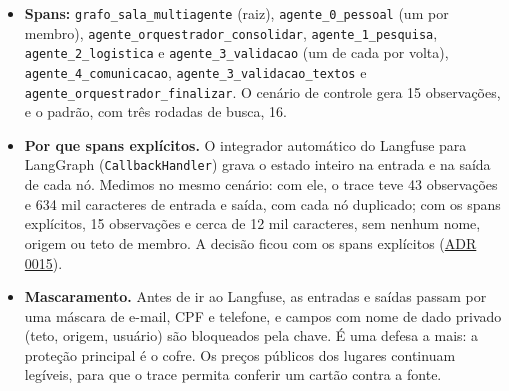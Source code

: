 \documentclass[12pt,a4paper]{article}
\begin{document}
\begin{itemize}
\item \textbf{Spans:} \texttt{grafo\_\allowbreak{}sala\_\allowbreak{}multiagente} (raiz), \texttt{agente\_\allowbreak{}0\_\allowbreak{}pessoal} (um por membro), \texttt{agente\_\allowbreak{}orquestrador\_\allowbreak{}consolidar}, \texttt{agente\_\allowbreak{}1\_\allowbreak{}pesquisa}, \texttt{agente\_\allowbreak{}2\_\allowbreak{}logistica} e \texttt{agente\_\allowbreak{}3\_\allowbreak{}validacao} (um de cada por volta), \texttt{agente\_\allowbreak{}4\_\allowbreak{}comunicacao}, \texttt{agente\_\allowbreak{}3\_\allowbreak{}validacao\_\allowbreak{}textos} e \texttt{agente\_\allowbreak{}orquestrador\_\allowbreak{}finalizar}. O cenário de controle gera 15 observações, e o padrão, com três rodadas de busca, 16.
\item \textbf{Por que spans explícitos.} O integrador automático do Langfuse para LangGraph (\texttt{CallbackHandler}) grava o estado inteiro na entrada e na saída de cada nó. Medimos no mesmo cenário: com ele, o trace teve 43 observações e 634 mil caracteres de entrada e saída, com cada nó duplicado; com os spans explícitos, 15 observações e cerca de 12 mil caracteres, sem nenhum nome, origem ou teto de membro. A decisão ficou com os spans explícitos (\href{https://github.com/Residencia-IA-Challenge-2-Grupo-7/residencia-ia-g7-challenge2/blob/main/docs/decisoes/0015-orquestracao-com-langgraph.md}{ADR 0015}).
\item \textbf{Mascaramento.} Antes de ir ao Langfuse, as entradas e saídas passam por uma máscara de e-mail, CPF e telefone, e campos com nome de dado privado (teto, origem, usuário) são bloqueados pela chave. É uma defesa a mais: a proteção principal é o cofre. Os preços públicos dos lugares continuam legíveis, para que o trace permita conferir um cartão contra a fonte.
\end{itemize}
\end{document}

